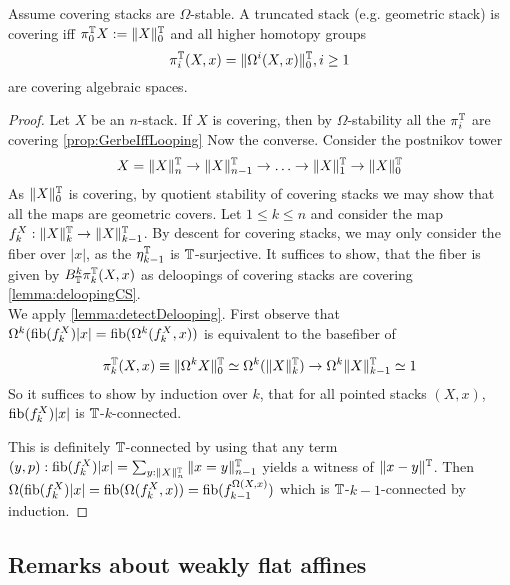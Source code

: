 \documentclass{article}
\begin{document}
\begin{prop}{\label{prop:htpyGroups}}
	Assume covering stacks are $\Omega$-stable.
	A truncated stack (e.g. geometric stack) is covering iff $\pi_0^{\mathbb{T}} X := \|X\|_0^{\mathbb{T}}$ and all higher homotopy groups 
	\[
	\pi_i^{\mathbb{T}}(X,x) = \|\Omega^i (X , x)\|_0^{\mathbb{T}} , i \ge 1
	\]
	are covering algebraic spaces.
\end{prop}
\begin{proof}
	Let $X$ be an $n$-stack.
	If $X$ is covering, then by $\Omega$-stability all the $\pi_i^{\mathbb{T}}$ are covering \ref{prop:GerbeIffLooping} Now the converse.
	Consider the postnikov tower
	\[
	X = \|X\|_n^{\mathbb{T}} \to \|X\|_{n-1}^{\mathbb{T}} \to \hdots \to \|X\|_1^{\mathbb{T}} \to \|X\|_0^{\mathbb{T}} 
	\]
	As $\|X\|_0^{\mathbb{T}}$ is covering, by quotient stability of covering stacks we may show that all the maps are geometric covers. 
	Let $1 \le k \le n$ and consider the map $f_k^X : \|X\|_{k}^{\mathbb{T}} \to \|X\|_{k-1}^{\mathbb{T}}$. By descent for covering stacks, we may only consider the fiber over $|x|$, as the $\eta_{k-1}^{\mathbb{T}}$ is $\mathbb{T}$-surjective. 
	It suffices to show, that the fiber is given by $B_{\mathbb{T}}^k \pi^{\mathbb{T}}_k(X,x)$ as deloopings of covering stacks are covering \ref{lemma:deloopingCS}.\\	
	We apply \ref{lemma:detectDelooping}.
	First observe that $\Omega^k (\operatorname{fib}(f_k^X) |x| = \operatorname{fib} (\Omega^k (f_k^X , x))$ is equivalent to the basefiber of
	
	\[
	\pi_k^{\mathbb{T}}(X,x) \equiv \|\Omega^k X \|_0^{\mathbb{T}} \simeq \Omega^k(\|X\|_k^{\mathbb{T}}) \to \Omega^k \|X\|_{k-1}^{\mathbb{T}} \simeq 1
	\]
	So it suffices to show by induction over $k$, that for all pointed stacks $(X,x)$, $\operatorname{fib}(f_k^X) |x|$ is $\mathbb{T}$-$k$-connected.
	
	This is definitely $\mathbb{T}$-connected by using that any term $(y, p) : \operatorname{fib}(f_k^X) |x| = \sum_{y : \|X\|_n^{\mathbb{T}}} \|x = y\|_{n-1}^{\mathbb{T}}$ yields a witness of $\|x - y\|^{\mathbb{T}}$. Then $\Omega (\operatorname{fib}(f_k^X) |x| = \operatorname{fib} (\Omega (f_k^X , x)) = \operatorname{fib} (f_{k-1}^{\Omega (X , x)})$ which is $\mathbb{T}$-$k-1$-connected by induction.
\end{proof}

\subsection{Remarks about weakly flat affines}
\end{document}
